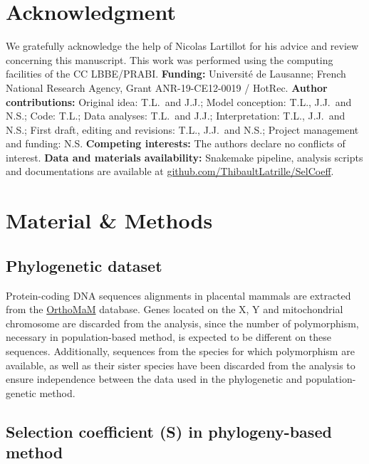 \documentclass{article}
\begin{document}
    \section*{Acknowledgment}
    \label{sec:acknowledgment}
    We gratefully acknowledge the help of Nicolas Lartillot for his advice and review concerning this manuscript.
    This work was performed using the computing facilities of the CC LBBE/PRABI\@.
    \textbf{Funding:}
    Université de Lausanne;
    French National Research Agency, Grant ANR-19-CE12-0019 / HotRec.
    \textbf{Author contributions:}
    Original idea: T.L.\ and J.J.;
    Model conception: T.L., J.J.\ and N.S.;
    Code: T.L.;
    Data analyses: T.L.\ and J.J.;
    Interpretation: T.L., J.J.\ and N.S.;
    First draft, editing and revisions: T.L., J.J.\ and N.S.;
    Project management and funding: N.S\@.
    \textbf{Competing interests:}
    The authors declare no conflicts of interest.
    \textbf{Data and materials availability:}
    Snakemake pipeline, analysis scripts and documentations are available at \href{https://github.com/ThibaultLatrille/SelCoeff}{github.com/ThibaultLatrille/SelCoeff}.


    \section{Material \& Methods}
    \label{sec:methods}

    \subsection{Phylogenetic dataset}

    Protein-coding DNA sequences alignments in placental mammals are extracted from the \href{https://www.orthomam.univ-montp2.fr}{OrthoMaM} database\cite{ranwez_orthomam_2007, douzery_orthomam_2014, scornavacca_orthomam_2019}.
    Genes located on the X, Y and mitochondrial chromosome are discarded from the analysis, since the number of polymorphism, necessary in population-based method, is expected to be different on these sequences.
    Additionally, sequences from the species for which polymorphism are available, as well as their sister species have been discarded from the analysis to ensure independence between the data used in the phylogenetic and population-genetic method.

    \subsection{Selection coefficient (S) in phylogeny-based method}
    \label{subsec:s-phylogeny-method}
\end{document}
